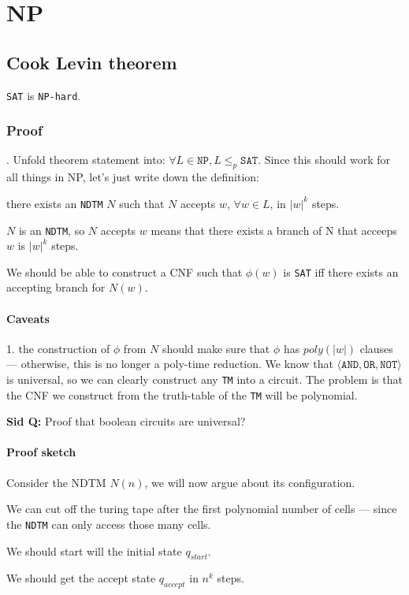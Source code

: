 \chapter{NP}
\section{Cook Levin theorem}
\texttt{SAT} is \texttt{NP-hard}. 
\subsection{Proof}.
Unfold theorem statement into:
$\forall L \in \texttt{NP}, L \leq_p \texttt{SAT}$. 
Since this should work for all things in NP, let's just write down the definition:

there exists an \texttt{NDTM} $N$ such that $N$ accepts $w$, $\forall w
\in L$, in $|w|^k$ steps.

$N$ is an \texttt{NDTM}, so $N$ accepts $w$ means that there exists a branch
of N that acceeps $w$ is $|w|^k$ steps.

We should be able to construct a CNF such that $\phi(w)$ is \texttt{SAT} iff
there exists an accepting branch for $N(w)$.

\subsubsection{Caveats}

1. the construction of $\phi$ from $N$ should make sure that
$\phi$ has $poly(|w|)$ clauses --- otherwise, this is no longer a poly-time
reduction.  We know that $\langle \texttt{AND}, \texttt{OR}, \texttt{NOT} \rangle$ is
universal, so we can clearly construct any \texttt{TM} into a circuit. The problem
is that the CNF we construct from the truth-table of the \texttt{TM} will be
polynomial.

\textbf{Sid Q:} Proof that boolean circuits are universal?

\subsubsection{Proof sketch}
Consider the NDTM $N(n)$, we will now argue about its configuration.

We can cut off the turing tape after the first polynomial number of cells ---
since the \texttt{NDTM} can only access those many cells.

We should start will the initial state $q_{start}$.

We should get the accept state $q_{accept}$ in $n^k$ steps.

